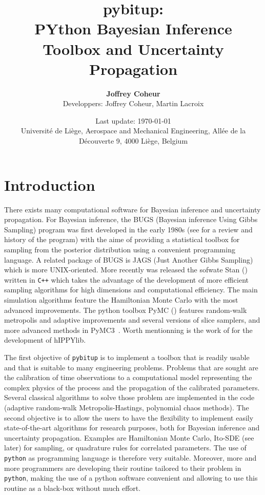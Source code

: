 \documentclass[a4paper,11pt]{article}
\title{\huge \textbf{pybitup: \\ PYthon Bayesian Inference Toolbox and Uncertainty Propagation}}
\author{\textbf{Joffrey Coheur} \\ \vspace{5pt} Developpers: Joffrey Coheur, Martin Lacroix}
\date{Last update: \today \\ 
\vspace{50pt}
Universit\'e de Li\`ege, Aerospace and Mechanical Engineering, All\'ee de la D\'ecouverte 9, 4000 Li\`ege, Belgium}
\begin{document}
\begin{titlepage}
\maketitle
\end{titlepage}


\section{Introduction} 

There exists many computational software for Bayesian inference and uncertainty propagation. For Bayesian inference, the BUGS (Bayesian inference Using Gibbs Sampling) program was first developed in the early 1980s  (see \cite{Lunn_2009} for a review and history of the program) with the aime of providing a statistical toolbox for sampling from the posterior distribution using a convenient programming language. A related package of BUGS is JAGS (Just Another Gibbs Sampling) which is more UNIX-oriented. More recently was released the sofwate Stan (\cite{Carpenter_2017}) written in \texttt{C++} which takes the advantage of the development of more efficient sampling algorithms for high dimensions and computational efficiency. The main simulation algorithms feature the Hamiltonian Monte Carlo with the most advanced improvements. The python toolbox PyMC (\cite{Patil_2010}) features random-walk metropolis and adaptive improvements and several versions of slice samplers, and more advanced methods in PyMC3~\cite{Salvatier_2016}. Worth mentionning is the work of \cite{VillaPetraGhattas19} for the development of  hIPPYlib. 

The first objective of \texttt{pybitup} is to implement a toolbox that is readily usable and that is suitable to many engineering problems. Problems that are sought are the calibration of time observations to a computational model representing the complex physics of the process and the propagation of the calibrated parameters. Several classical algorithms to solve those problem are implemented in the code (adaptive random-walk Metropolis-Hastings, polynomial chaos methods). The second objective is to allow the users to have the flexibility to implement easily state-of-the-art algorithms for research purposes, both for Bayesian inference and uncertainty propagation. Examples are Hamiltonian Monte Carlo, Ito-SDE (see later) for sampling, or quadrature rules for correlated parameters. The use of \texttt{python} as programming language is therefore very suitable. Moreover, more and more programmers are developing their routine tailored to their problem in \texttt{python}, making the use of a python software convenient and allowing to use this routine as a black-box without much effort. 
\end{document}
